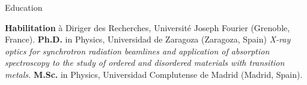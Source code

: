 \begin{rubric}{Education}

\entry*[2004]%
    \textbf{Habilitation} \`a Diriger des Recherches, Universit\'e Joseph Fourier (Grenoble, France).
\entry*[1987-1991]%
	\textbf{Ph.D.} in Physics, Universidad de Zaragoza (Zaragoza, Spain)
    \emph{X-ray optics for synchrotron radiation beamlines and application of absorption spectroscopy to the study of ordered and disordered materials with transition metals.}
\entry*[1980-1986]%
	\textbf{M.Sc.} in Physics, Universidad Complutense de Madrid (Madrid, Spain).
%
\end{rubric}